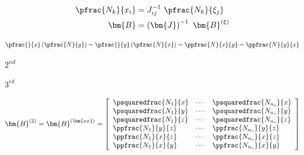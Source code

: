 \documentclass{article}
\begin{document}
\begin{eqnarray}\label{eqn:jacobian_applied}
    \pfrac{N_k}{x_i} &= J_{ij}^{-1} \ \pfrac{N_k}{\xi_j} \\
    \bm{B} &= \left( \bm{J} \right)^{-1} \ \bm{B}^{(\xi)}
\end{eqnarray}
\pagebreak

\[ \begin{equation}\label{eqn:schwarz_theorem}
    \pfrac{}{x} \left( \pfrac{N}{y} \right) = \pfrac{}{y} \left( \pfrac{N}{x} \right) = \ppfrac{N}{x}{y} = \ppfrac{N}{y}{x}
\end{equation} \]
\pagebreak

$ 2^{nd} $
\pagebreak

$ 3^{rd} $
\pagebreak

\[ \begin{equation}\label{eqn:B2}
    \bm{B}^{(2)} = \bm{B}^{(\bm{xx})} =
    \left[ \begin{array}{lll} 
        \psquaredfrac{N_1}{x} &
        \cdots &
        \psquaredfrac{N_{n_s}}{x}
        \\
        \psquaredfrac{N_1}{y} &
        \cdots &
        \psquaredfrac{N_{n_s}}{y}
        \\
        \psquaredfrac{N_1}{z} &
        \cdots &
        \psquaredfrac{N_{n_s}}{z}
        \\
        \ppfrac{N_1}{y}{z} &
        \cdots &
        \ppfrac{N_{n_s}}{y}{z}
        \\
        \ppfrac{N_1}{x}{z} &
        \cdots &
        \ppfrac{N_{n_s}}{x}{z}
        \\
        \ppfrac{N_1}{x}{y} &
        \cdots &
        \ppfrac{N_{n_s}}{x}{y}
    \end{array} \right] 
\end{equation} \]
\pagebreak
\end{document}
